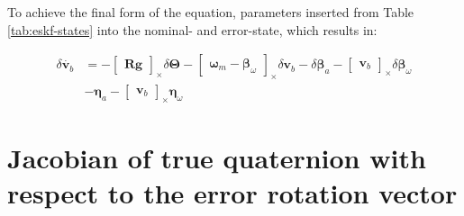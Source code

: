 To achieve the final form of the equation, parameters inserted from Table \ref{tab:eskf-states} into the nominal- and error-state, which results in:
\begin{tcolorbox}
\begin{equation}
\begin{aligned}
    \delta \dot{\mathbf{v}_b}&=-\begin{bmatrix}\mathbf{R}\mathbf{g}\end{bmatrix}_\times\delta\boldsymbol{\Theta} -\begin{bmatrix}\boldsymbol{\omega}_m-\boldsymbol{\beta}_\omega\end{bmatrix}_\times\delta \mathbf{v}_b 
    -\delta\boldsymbol{\beta}_a-\begin{bmatrix}\mathbf{v}_b \end{bmatrix}_\times\delta\boldsymbol{\beta}_\omega \\ &
    -\boldsymbol{\eta}_{a}-\begin{bmatrix}\mathbf{v}_b \end{bmatrix}_\times\boldsymbol{\eta}_{\omega}
\end{aligned}
\end{equation}
\end{tcolorbox}

\section{Jacobian of true quaternion with respect to the error rotation vector}
\label{app:der-true-quat-by-error-rotvec}

